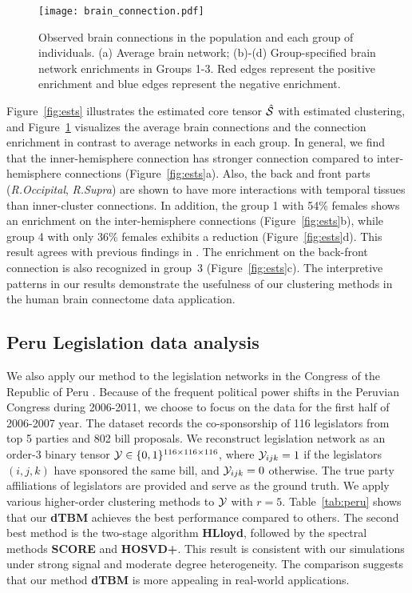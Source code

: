 \documentclass[journal]{IEEEtran}
\theoremstyle{definition}
\theoremstyle{definition}
\begin{document}
\begin{figure}[htb]
    \centering
    \texttt{[image: brain\_connection.pdf]}
    \caption{Observed brain connections in the population and each group of individuals. (a) Average brain network; (b)-(d) Group-specified brain network enrichments in Groups 1-3. Red edges represent the positive enrichment and blue edges represent the negative enrichment.}
    \label{fig:brain_conn}
\end{figure}

Figure~\ref{fig:ests} illustrates the estimated core tensor $\hat {\mathcal{S}}$ with estimated clustering, and Figure~\ref{fig:brain_conn} visualizes the average brain connections and the connection enrichment in contrast to average networks in each group. In general, we find that the inner-hemisphere connection has stronger connection compared to inter-hemisphere connections (Figure~\ref{fig:ests}a). Also, the back and front parts (\emph{R.Occipital}, \emph{R.Supra}) are shown to have more interactions with temporal tissues than inner-cluster connections. In addition, the group 1 with 54\% females shows an enrichment on the inter-hemisphere connections (Figure~\ref{fig:ests}b), while group 4 with only 36\% females exhibits a reduction (Figure~\ref{fig:ests}d). This result agrees with previous findings in \cite{hu2021generalized}. The enrichment on the back-front connection is also recognized in group~3 (Figure~\ref{fig:ests}c). The interpretive patterns in our results demonstrate the usefulness of our clustering methods in the human brain connectome data application. 

\subsection{Peru Legislation data analysis}

We also apply our method to the legislation networks in the Congress of the Republic of Peru \citep{lee2017time}. Because of the frequent political power shifts in the Peruvian Congress during 2006-2011, we choose to focus on the data for the first half of 2006-2007 year. The dataset records the co-sponsorship of 116 legislators from top 5 parties and 802 bill proposals. We reconstruct legislation network as an order-3 binary tensor $\mathcal{Y} \in \{0,1\}^{116 \times 116 \times 116}$, where $\mathcal{Y}_{ijk} = 1$ if the legislators $(i,j,k)$ have sponsored the same bill, and $\mathcal{Y}_{ijk} = 0$ otherwise. The true party affiliations of legislators are provided and serve as the ground truth. We apply various higher-order clustering methods to $\mathcal{Y}$ with $r = 5$. Table~\ref{tab:peru} shows that our \textbf{\small dTBM} achieves the best performance compared to others. The second best method is the two-stage algorithm \textbf{\small HLloyd}, followed by the spectral methods \textbf{\small SCORE} and \textbf{\small HOSVD+}. This result is consistent with our simulations under strong signal and moderate degree heterogeneity. The comparison suggests that our method \textbf{\small dTBM} is more appealing in real-world applications.
\end{document}
